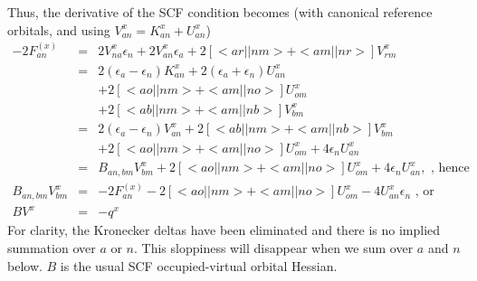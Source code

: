 \documentclass[fleqn,12pt]{article}
\newcommand{\bra}{<\!}
\newcommand{\ket}{\!>}
\newcommand{\Fx}{F^{(x)}}
\begin{document}
Thus, the derivative of the SCF condition becomes (with canonical
reference orbitals, and using $V^x_{an} = K^x_{an} + U^x_{an}$)
\begin{eqnarray}
  -2\Fx_{an} & = & 2V^x_{na} \epsilon_n +  2V^x_{an} \epsilon_a +
       2\left[ \bra ar||nm \ket + \bra am||nr \ket \right] V^x_{rm} \\
  & = & 2 \left( \epsilon_a - \epsilon_n \right) K^x_{an}  +
  2 \left( \epsilon_a + \epsilon_n \right) U^x_{an}  \nonumber \\
  & & + 2\left[ \bra ao||nm \ket + \bra am||no \ket \right] U^x_{om}
   \nonumber \\
  & & + 2\left[ \bra ab||nm \ket + \bra am||nb \ket \right] V^x_{bm} \\
  & = & 2 \left( \epsilon_a - \epsilon_n \right) V^x_{an} 
      + 2\left[ \bra ab||nm \ket + \bra am||nb \ket \right] V^x_{bm}
      \nonumber \\ 
  & & + 2\left[ \bra ao||nm \ket + \bra am||no \ket \right] U^x_{om} 
      + 4 \epsilon_n U^x_{an} \\
  & = & B_{an,bm} V^x_{bm} +  2\left[ \bra ao||nm \ket + 
        \bra am||no \ket \right] U^x_{om} + 4 \epsilon_n U^x_{an},
      \mbox{ , hence } \\
  B_{an,bm} V^x_{bm} & = &   -2\Fx_{an} - 2\left[ \bra ao||nm \ket
    + \bra am||no \ket \right] U^x_{om} - 4 U^x_{an} \epsilon_n 
     \mbox{ , or } \\
  B V^x & = & -q^x
\end{eqnarray}
For clarity, the Kronecker deltas have been eliminated and there is no
implied summation over $a$ or $n$.  This sloppiness will disappear
when we sum over $a$ and $n$ below.  $B$ is the usual SCF
occupied-virtual orbital Hessian.
\end{document}
